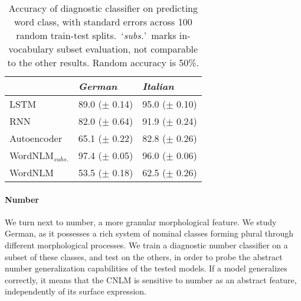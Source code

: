\begin{table}[t]
\footnotesize
    \begin{center}
      \begin{tabular}{l|l|l}
        &\emph{German}&\emph{Italian}\\
        \hline
        LSTM & 89.0 ($\pm$ 0.14) & 95.0 ($\pm$ 0.10) \\
        RNN & 82.0 ($\pm$ 0.64) & 91.9 ($\pm$ 0.24) \\
        Autoencoder & 65.1 ($\pm$ 0.22) & 82.8 ($\pm$ 0.26) \\
	      WordNLM$_{\textit{subs.}}$ & 97.4 ($\pm$ 0.05) & 96.0 ($\pm$ 0.06) \\
	      WordNLM & 53.5 ($\pm$ 0.18)  & 62.5 ($\pm$ 0.26) \\
      \end{tabular}
    \end{center}
	\caption{\label{tab:pos-results} Accuracy of diagnostic classifier on predicting word class, with standard errors across 100 random train-test splits.~`\emph{subs.}'~marks in-vocabulary subset evaluation, not comparable to the other results. Random accuracy is 50\%.} %
\end{table}






\paragraph{Number}
We turn next to number, a more granular morphological feature. We
study German, as it possesses a rich system of nominal classes forming
plural through different morphological processes. We train a diagnostic number
classifier on a subset of these classes, and test on the others, in order to probe the abstract number generalization capabilities of the tested models. If a
model generalizes correctly, it means that the CNLM is sensitive to number
as an abstract feature, independently of its surface expression.

